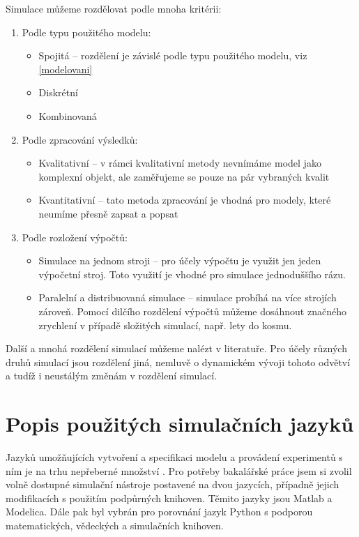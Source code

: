 Simulace můžeme rozdělovat podle mnoha kritérii:
\begin{enumerate}
    \item Podle typu použitého modelu:
        \begin{itemize}
            \item Spojitá -- rozdělení je závislé podle typu použitého modelu, viz \ref{modelovani}
            \item Diskrétní
            \item Kombinovaná
        \end{itemize}
    \item Podle zpracování výsledků:
        \begin{itemize}
            \item Kvalitativní -- v rámci kvalitativní metody nevnímáme model jako komplexní objekt, ale zaměřujeme se pouze na pár vybraných kvalit
            \item Kvantitativní -- tato metoda zpracování je vhodná pro modely, které neumíme přesně zapsat a popsat
        \end{itemize}
    \item Podle rozložení výpočtů:
        \begin{itemize}
            \item Simulace na jednom stroji -- pro účely výpočtu je využit jen jeden výpočetní stroj. Toto využití je vhodné pro simulace jednoduššího rázu.
            \item Paralelní a distribuovaná simulace -- simulace probíhá na více strojích zároveň. Pomocí dilčího rozdělení výpočtů můžeme dosáhnout značného zrychlení v případě složitých simulací, např. lety do kosmu.
        \end{itemize}
\end{enumerate}
Další a mnohá rozdělení simulací můžeme nalézt v literatuře. Pro účely různých druhů simulací jsou rozdělení jiná, nemluvě o dynamickém vývoji tohoto odvětví a tudíž i neustálým změnám v rozdělení simulací.

\section{Popis použitých simulačních jazyků}

Jazyků umožňujících vytvoření a specifikaci modelu a provádení experimentů s ním je na trhu nepřeberné množství \cite{blablabla}. Pro potřeby bakalářské práce jsem si zvolil volně dostupné simulační nástroje postavené na dvou jazycích, případně jejich modifikacích s použitím podpůrných knihoven. Těmito jazyky jsou Matlab a Modelica. Dále pak byl vybrán pro porovnání jazyk Python s podporou matematických, vědeckých a simulačních knihoven.

